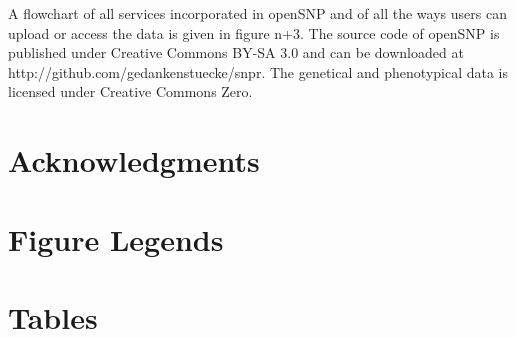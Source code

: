 \documentclass[10pt]{article}
\begin{document}
A flowchart of all services incorporated in openSNP and of all the ways users can upload or access the data is given in figure n+3. The source code of openSNP is 
published under Creative Commons BY-SA 3.0 and can be downloaded at http://github.com/gedankenstuecke/snpr. The genetical and phenotypical data is licensed under Creative Commons Zero. 
\section*{Acknowledgments}




\section*{Figure Legends}


\section*{Tables}
\end{document}
